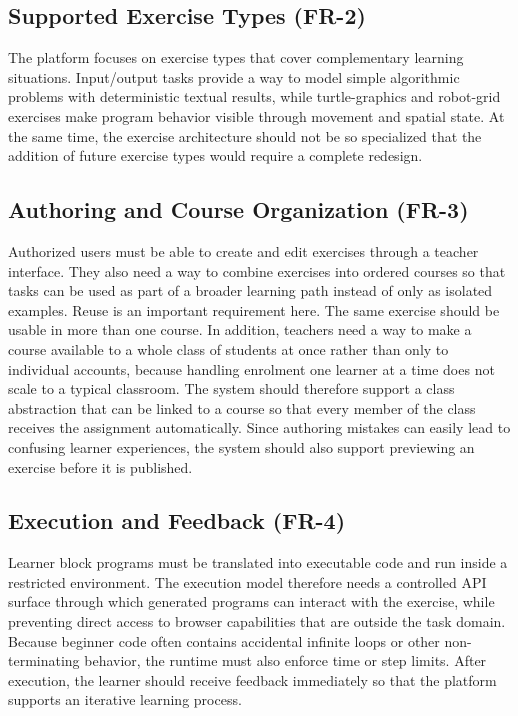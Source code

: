 \subsection*{Supported Exercise Types (FR-2)}
The platform focuses on exercise types that cover complementary learning situations. Input/output tasks provide a way to model simple algorithmic problems
with deterministic textual results, while turtle-graphics and robot-grid exercises make program behavior visible through movement and spatial state.
At the same time, the exercise architecture should not be so specialized that the addition of future exercise types would require a complete redesign.

\subsection*{Authoring and Course Organization (FR-3)}
Authorized users must be able to create and edit exercises through a teacher interface. 
They also need a way to combine exercises into ordered courses so that tasks can be used as part of a broader learning path instead of only as isolated examples. 
Reuse is an important requirement here. The same exercise should be usable in more than one course. In addition, teachers need a way to make a course available to a whole class of students at once rather 
than only to individual accounts, because handling enrolment one learner at a time does not scale to a typical classroom. The system should therefore support a class abstraction that can be linked to a course 
so that every member of the class receives the assignment automatically. Since authoring mistakes can easily lead to confusing learner experiences, the system should also support previewing an 
exercise before it is published. 

\subsection*{Execution and Feedback (FR-4)}
Learner block programs must be translated into executable code and run inside a restricted environment. The execution model therefore needs a controlled API surface through which 
generated programs can interact with the exercise, while preventing direct access to browser capabilities that are outside the task domain. Because beginner code often contains accidental infinite 
loops or other non-terminating behavior, the runtime must also enforce time or step limits. After execution, the learner should receive feedback immediately so that the platform supports an iterative
learning process.

